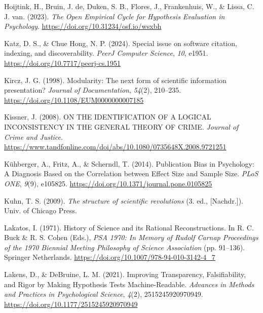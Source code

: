 \documentclass[
  man, noextraspace,floatsintext]{apa7}
\newlength{\cslhangindent}
\newenvironment{CSLReferences}[2] %
 {\begin{list}{}{%
  \setlength{\itemindent}{0pt}
  \setlength{\leftmargin}{0pt}
  \setlength{\parsep}{0pt}
  \ifodd #1
   \setlength{\leftmargin}{\cslhangindent}
   \setlength{\itemindent}{-1\cslhangindent}
  \fi
  \setlength{\itemsep}{#2\baselineskip}}}
 {\end{list}}
\begin{document}
\begin{CSLReferences}{1}{0}
Hoijtink, H., Bruin, J. de, Duken, S. B., Flores, J., Frankenhuis, W., \& Lissa, C. J. van. (2023). \emph{The {Open Empirical Cycle} for {Hypothesis Evaluation} in {Psychology}}. \url{https://doi.org/10.31234/osf.io/wsxbh}

Katz, D. S., \& Chue Hong, N. P. (2024). Special issue on software citation, indexing, and discoverability. \emph{PeerJ Computer Science}, \emph{10}, e1951. \url{https://doi.org/10.7717/peerj-cs.1951}

Kircz, J. G. (1998). Modularity: The next form of scientific information presentation? \emph{Journal of Documentation}, \emph{54}(2), 210--235. \url{https://doi.org/10.1108/EUM0000000007185}

Kissner, J. (2008). {ON THE IDENTIFICATION OF A LOGICAL INCONSISTENCY IN THE GENERAL THEORY OF CRIME}. \emph{Journal of Crime and Justice}. \url{https://www.tandfonline.com/doi/abs/10.1080/0735648X.2008.9721251}

Kühberger, A., Fritz, A., \& Scherndl, T. (2014). Publication {Bias} in {Psychology}: {A Diagnosis Based} on the {Correlation} between {Effect Size} and {Sample Size}. \emph{PLoS ONE}, \emph{9}(9), e105825. \url{https://doi.org/10.1371/journal.pone.0105825}

Kuhn, T. S. (2009). \emph{The structure of scientific revolutions} (3. ed., {[}Nachdr.{]}). Univ. of Chicago Press.

Lakatos, I. (1971). History of {Science} and its {Rational Reconstructions}. In R. C. Buck \& R. S. Cohen (Eds.), \emph{{PSA} 1970: {In Memory} of {Rudolf Carnap Proceedings} of the 1970 {Biennial Meeting Philosophy} of {Science Association}} (pp. 91--136). Springer Netherlands. \url{https://doi.org/10.1007/978-94-010-3142-4_7}

Lakens, D., \& DeBruine, L. M. (2021). Improving {Transparency}, {Falsifiability}, and {Rigor} by {Making Hypothesis Tests Machine-Readable}. \emph{Advances in Methods and Practices in Psychological Science}, \emph{4}(2), 2515245920970949. \url{https://doi.org/10.1177/2515245920970949}


\end{CSLReferences}
\end{document}
